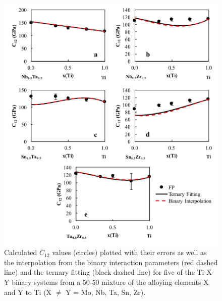 \pagebreak
\begin{figure}[H]
	\centering
	\includegraphics[width=\textwidth]{Chapter-6/Figures/tixyc122.png}
	\caption{Calculated $\overline{C}_{12}$ values (circles) plotted with their errors as well as the interpolation from the binary interaction parameters (red dashed line) and the ternary fitting (black dashed line) for five of the Ti-X-Y binary systems from a 50-50 mixture of the alloying elements X and Y to Ti (X $\neq$ Y = Mo, Nb, Ta, Sn, Zr).}
	\label{Ch6-figure:tixyc12_2}
\end{figure}

